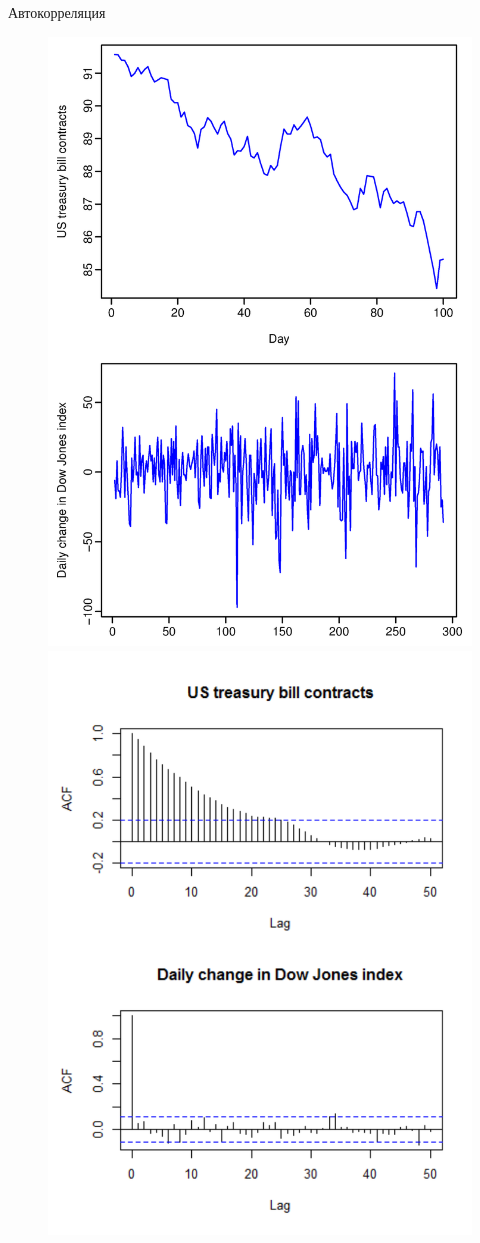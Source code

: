 \begin{frame}{Автокорреляция}
\begin{figure}
    \centering
    \includegraphics[width=0.45\linewidth]{lecture_2/fig/ts_components_2.png}
    \includegraphics[width=0.53\linewidth]{lecture_2/fig/4acf_2.png}
\end{figure}
\end{frame}


